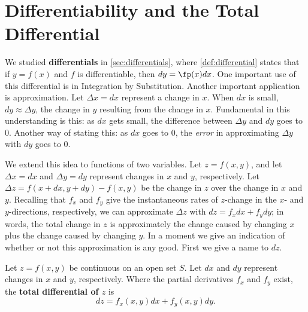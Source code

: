 \section{Differentiability and the Total Differential}\label{sec:total_differential}

We studied \textbf{differentials} in \autoref{sec:differentials}, where \autoref{def:differential}  states that if $y=f(x)$ and $f$ is differentiable, then $dy=\fp(x)dx$. One important use of this differential is in Integration by Substitution. Another important application is approximation. Let $\Delta x = dx$ represent a change in $x$. When $dx$ is small, $dy\approx \Delta y$, the change in $y$ resulting from the change in $x$. Fundamental in this understanding is this: as $dx$ gets small, the difference between $\Delta y$ and $dy$ goes to 0. Another way of stating this: as $dx$ goes to 0, the \textit{error} in approximating $\Delta y$ with $dy$ goes to 0.

We extend this idea to functions of two variables. Let $z=f(x,y)$, and let $\Delta x = dx$ and $\Delta y=dy$ represent changes in $x$ and $y$, respectively. Let $\Delta z = f(x+dx,y+dy) - f(x,y)$ be the change in $z$ over the change in $x$ and $y$. Recalling that $f_x$ and $f_y$ give the instantaneous rates of $z$-change in the $x$- and $y$-directions, respectively, we can approximate $\Delta z$ with $dz = f_xdx+f_ydy$; in words, the total change in $z$ is approximately the change caused by changing $x$ plus the change caused by changing $y$. In a moment we give an indication of whether or not this approximation is any good. First we give a name to $dz$.

\begin{definition}\label{def:total_differential}
Let $z=f(x,y)$ be continuous on an open set $S$. Let $dx$ and $dy$ represent changes in $x$ and $y$, respectively. Where the partial derivatives $f_x$ and $f_y$ exist, the \textbf{total differential of $z$} is 
\[dz = f_x(x,y)dx + f_y(x,y)dy.\]
\end{definition}




